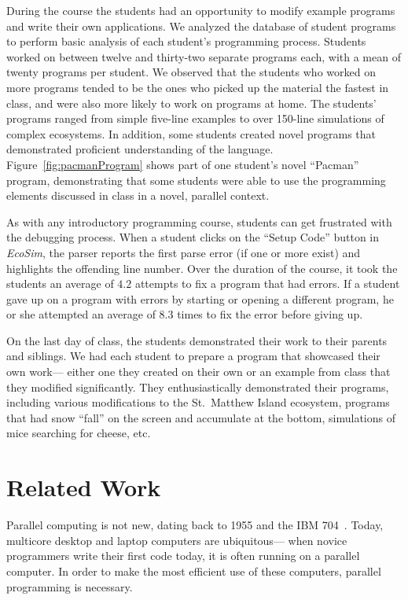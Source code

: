 \documentclass{sig-alternate}
\newcommand{\FIXME}[1]{{\color{red}\{FIXME #1\}}}
\begin{document}
During the course the students had an opportunity to modify example programs and write their own applications.  
We analyzed the database of student programs to perform basic analysis of each student's programming process.
Students worked on between twelve and thirty-two separate programs each, with a mean of twenty programs per student.  
We observed that the students who worked on more programs tended to be the ones who picked up
the material the fastest in class, and were also more likely to work on programs at home.  
The students' programs ranged from simple five-line examples to over 150-line simulations of complex ecosystems.
In addition, some students created novel programs that demonstrated proficient understanding of the language.  
Figure~\ref{fig:pacmanProgram} shows part of one student's novel ``Pacman'' program, 
demonstrating that some students were able to use the programming elements discussed in class
in a novel, parallel context.

As with any introductory programming course, students can get frustrated with the debugging
process.  When a student clicks on the ``Setup Code'' button in \emph{EcoSim}, the parser reports
the first parse error (if one or more exist) and highlights the offending line number.  Over the
duration of the course, it took the students an average of $4.2$ attempts to fix a program that
had errors.  If a student gave up on a program with errors by starting or opening a different
program, he or she attempted an average of $8.3$ times to fix the error before giving up.


On the last day of class, the students demonstrated their work to their parents and siblings. 
We had each student to prepare a program that showcased their own work---%
either one they created on their own or an example from class that they modified significantly.
They enthusiastically demonstrated their programs,
including various modifications to the St.~Matthew Island ecosystem,
programs that had snow ``fall'' on the screen and accumulate at the bottom,
simulations of mice searching for cheese,
etc.

\section{Related Work}
Parallel computing is not new, dating back to 1955 and the IBM 704~\cite{hockney1988parallel}.
Today, multicore desktop and laptop computers are ubiquitous---%
when novice programmers write their first code today, it is often running on a parallel computer.
In order to make the most efficient use of these computers, parallel programming is necessary.  
\end{document}
